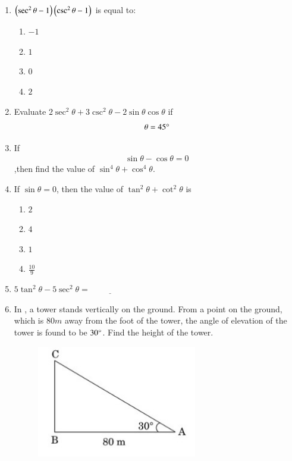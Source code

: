 \begin{enumerate}
    \hfill{}\item $\left(\sec^2\theta - 1\right)\left(\csc^2\theta - 1\right)$  is equal to:
    \begin{enumerate}
   \item $-1$
   \item  $1$
   \item  $0$
   \item  $2$
        \end{enumerate}
   \hfill{}\item Evaluate $2\sec^2\theta+3\csc^2\theta-2\sin\theta\cos\theta$ if
   \begin{align}
      \theta=45\degree
   \end{align}
   
   \hfill{}\item If
   \begin{align}
       \sin\theta-\cos\theta=0
   \end{align}
   ,then find the value of $\sin^4\theta+\cos^4\theta$.
  \hfill{}
    \item If $\sin \theta=0$, then the value of $\tan^2\theta+\cot^2\theta$ is
    \begin{enumerate}
        \item $2$
        \item $4$
        \item $1$
        \item $\frac{10}{9}$
    \end{enumerate}
    \hfill{}\item $5\tan^2 \theta - 5\sec^2\theta = \underline{\hspace{2cm}}$
    \hfill{}\item In  , a tower stands vertically on the ground. From a point on the ground, which is $80m$ away from the foot of the tower, the angle of elevation of the tower is found to be $30\degree$. Find the height of the tower.
    \begin{figure}[H]
        \centering
        \includegraphics[width=70mm]{cbse/figs/as.jpeg}

\end{figure}
\end{enumerate}
